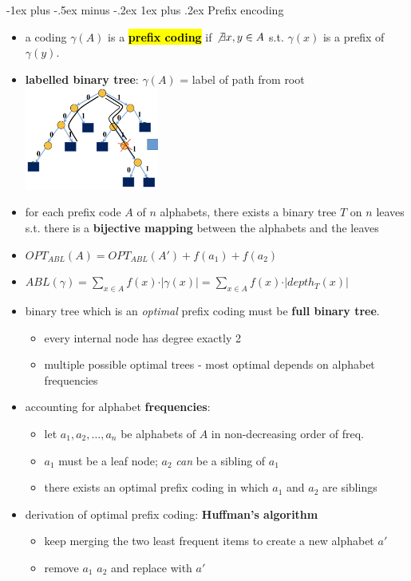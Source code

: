 \documentclass[10pt,landscape]{article}
\makeatletter
\newcommand{\subsubsubsection}{\@startsection{subsubsection}{3}{0mm}%
                                {-1ex plus -.5ex minus -.2ex}%
                                {1ex plus .2ex}%
                                {\normalfont\scriptsize\bfseries}}
\newcommand{\1}{\mathmybb{1}}
\newcommand{\ildefinition}[1]{\sethlcolor{paleyellow}\hl{\textbf{#1}}}
\makeatother
\begin{document}
\begin{multicols*}{3}
  \subsubsubsection{Prefix encoding}
  \begin{itemize}[topsep=0pt,noitemsep,wide=0pt, leftmargin=\dimexpr{} + 2\relax]
    \item a coding $\gamma(A)$ is a \ildefinition{prefix coding} if $\not\exists x, y \in A$ s.t. $\gamma(x)$ is a prefix of $\gamma(y)$.
    \item \textbf{labelled binary tree}: $\gamma(A)$ = label of path from root
      \includegraphics[height=3.4cm,width=0.6\linewidth]{images/prefix-encoding.png} 
    \item for each prefix code $A$ of $n$ alphabets, there exists a binary tree $T$ on $n$ leaves s.t. there is a \textbf{bijective mapping} between the alphabets and the leaves
    \item $OPT_{ABL}(A) = OPT_{ABL}(A') + f(a_1) + f(a_2)$
    \item $ABL(\gamma) = \sum\limits_{x \in A} f(x) \cdot \vert \gamma(x) \vert = \sum\limits_{x \in A} f(x) \cdot \vert depth_T (x) \vert$
    \item binary tree which is an \textit{optimal} prefix coding must be \textbf{full binary tree}.
      \begin{itemize}[topsep=0pt,noitemsep,wide=0pt, leftmargin=\dimexpr{} + 2\relax]
        \item every internal node has degree exactly 2
        \item multiple possible optimal trees - most optimal depends on alphabet frequencies
      \end{itemize}
    \item accounting for alphabet \textbf{frequencies}:
      \begin{itemize}[topsep=0pt,noitemsep,wide=0pt, leftmargin=\dimexpr{} + 2\relax]
        \item let $a_1, a_2, \dots, a_n$ be alphabets of $A$ in non-decreasing order of freq.
        \item $a_1$ must be a leaf node; $a_2$ \textit{can} be a sibling of $a_1$
        \item there exists an optimal prefix coding in which $a_1$ and $a_2$ are siblings
      \end{itemize}
    \item derivation of optimal prefix coding: \textbf{Huffman's algorithm}
      \begin{itemize}[topsep=0pt,noitemsep,wide=0pt, leftmargin=\dimexpr{} + 2\relax]
        \item keep merging the two least frequent items to create a new alphabet $a'$
        \item remove $a_1$ $a_2$ and replace with $a'$
      \end{itemize}
  \end{itemize}


\end{multicols*}
\end{document}
